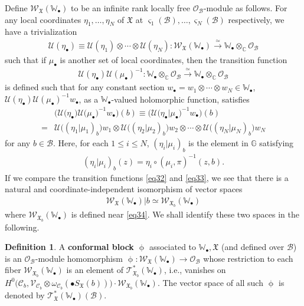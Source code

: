 \documentclass[12pt,a4paper,notitlepage]{article}
\theoremstyle{definition}
\newtheorem{df}{Definition}[section]
\theoremstyle{plain}
\newcommand{\fk}{\mathfrak}
\newcommand{\mc}{\mathcal}
\newcommand{\scr}{\mathscr}
\newcommand{\sgm}{\varsigma}
\newcommand{\SX}{S_{\fk X}}
\newcommand{\blt}{\bullet}
\newcommand{\Wbb}{\mathbb W}
\newcommand{\Gbb}{\mathbb G}
\newcommand{\Cbb}{\mathbb C}
\numberwithin{equation}{section}
\begin{document}
Define $\scr W_{\fk X}(\Wbb_\blt)$ \index{WX@$\scr W_{\fk X}(\Wbb_\blt)$} to be an infinite rank locally free $\scr O_{\mc B}$-module as follows. For any  local coordinates $\eta_1,\dots,\eta_N$ of $\fk X$ at $\sgm_1(\mc B),\dots,\sgm_N(\mc B)$ respectively, we have a trivialization \index{U@$\mc U(\eta_\blt)$}
\begin{align}
\mc U(\eta_\blt)\equiv \mc U(\eta_1)\otimes\cdots\otimes\mc U(\eta_N):\scr W_{\fk X}(\Wbb_\blt)\xrightarrow{\simeq}\Wbb_\blt\otimes_\Cbb\scr O_{\mc B}\label{eq37}
\end{align}
such that if $\mu_\blt$ is another set of local coordinates, then the transition function
\begin{align*}
\mc U(\eta_\blt)\mc U(\mu_\blt)^{-1}:\Wbb_\blt\otimes_\Cbb\scr O_{\mc B}\xrightarrow{\simeq}\Wbb_\blt\otimes_\Cbb\scr O_{\mc B}
\end{align*}
is defined such that for any constant section $w_\blt=w_1\otimes\cdots\otimes w_N\in\Wbb_\blt$, $\mc U(\eta_\blt)\mc U(\mu_\blt)^{-1}w_\blt$, as a $\Wbb_\blt$-valued holomorphic function, satisfies
\begin{align}
&\Big(\mc U\big(\eta_\blt\big)\mc U\big(\mu_\blt\big)^{-1}w_\blt\Big )(b)\equiv \Big(\mc U\big(\eta_\blt\big|\mu_\blt\big)^{-1}w_\blt\Big )(b)\nonumber\\
=&\mc U\big((\eta_1|\mu_1)_b \big)w_1\otimes\mc U\big((\eta_2|\mu_2)_b \big)w_2\otimes\cdots\otimes \mc U\big((\eta_N|\mu_N)_b \big)w_N \label{eq33}
\end{align}
for any $b\in \mc B$. Here, for each $1\leq i\leq N$, $(\eta_i|\mu_i)_b$ is the element in $\Gbb$ satisfying
\begin{align}
(\eta_i|\mu_i)_b(z)=\eta_i\circ(\mu_i,\pi)^{-1}(z,b).
\end{align}
If we compare the transition functions \eqref{eq32} and \eqref{eq33}, we see that there is a natural and coordinate-independent isomorphism of vector spaces
\begin{align*}
\scr W_{\fk X}(\Wbb_\blt)|b\simeq \scr W_{\fk X_b}(\Wbb_\blt)
\end{align*}
where $\scr W_{\fk X_b}(\Wbb_\blt)$ is defined near \eqref{eq34}. We shall identify these two spaces in the following.


\begin{df}\label{lb17}
A \textbf{conformal block} $\upphi$ associated to $\Wbb_\blt,\fk X$ (and defined over $\mc B$) is an $\scr O_{\mc B}$-module homomorphism $\upphi:\scr W_{\fk X}(\Wbb_\blt)\rightarrow\scr O_{\mc B}$ whose restriction to each fiber $\scr W_{\fk X_b}(\Wbb_\blt)$ is an element of $\scr T_{\fk X_b}^*(\Wbb_\blt)$, i.e., vanishes on $H^0\big(\mc C_b,\scr V_{\mc C_b}\otimes\omega_{\mc C_b}(\blt\SX(b))\big)\cdot\scr W_{\fk X_b}(\Wbb_\blt)$. The vector space of all such $\upphi$ is denoted \index{T@$\scr T_{\fk X}^*(\Wbb_\blt),\scr T_{\fk X}^*(\Wbb_\blt)(\mc B)$} by $\scr T_{\fk X}^*(\Wbb_\blt)(\mc B)$.
\end{df}
\end{document}
